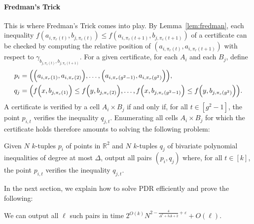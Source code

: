 \paragraph{Fredman's Trick}
This is where Fredman's Trick comes into play.
By Lemma~\ref{lem:fredman}, each inequality
$f(a_{i,\pi_r(t)},b_{j,\pi_c(t)}) \le f(a_{i,\pi_r(t+1)},b_{j,\pi_c(t+1)})$
of a certificate can be checked
by computing the relative position of $(a_{i,\pi_r(t)},a_{i,\pi_r(t+1)})$ with
respect to $\gamma_{b_{j,\pi_c(t)},b_{j,\pi_c(t+1)}}$.
For a given certificate, for each $A_i$ and each $B_j$, define
%
\begin{align*}
p_i &= \mleft(
    \Big(a_{i,\pi_r(1)},a_{i,\pi_r(2)}\Big),
    \ldots,
    \Big(a_{i,\pi_r(g^2-1)},a_{i,\pi_r(g^2)}\Big)
\mright),\\
q_j &= \mleft(
    f\Big(x,b_{j,\pi_c(1)}\Big) \le f\Big(y,b_{j,\pi_c(2)}\Big),
    \ldots,
    f\Big(x,b_{j,\pi_c(g^2-1)}\Big) \le f\Big(y,b_{j,\pi_c(g^2)}\Big)
\mright).
\end{align*}
%
A certificate is verified by a cell $A_i \times B_j$ if and only if, for all
$t \in [g^2-1]$, the point $p_{i,t}$ verifies the inequality $q_{j,t}$.
Enumerating all cells $A_i\times B_j$ for which the
certificate holds therefore amounts to solving the following problem:
%
\begin{problem}
Given $N$ $k$-tuples $p_i$ of points in $\mathbb{R}^2$ and $N$ $k$-tuples $q_j$
of bivariate polynomial inequalities of degree at most $\Delta$,
output all pairs $(p_i,q_j)$ where, for all $t \in [k]$,
the point $p_{i,t}$ verifies the inequality $q_{j,t}$.
\end{problem}
%
In the next section, we explain how to solve PDR efficiently
and prove the following:
\begin{lemma}\label{lem:dominance}
    We can output
    all $\ell$ such pairs in time
    $2^{O(k)} N^{2-\frac{4}{\Delta^2+3\Delta+2}+\varepsilon} + O(\ell)$.
\end{lemma}

